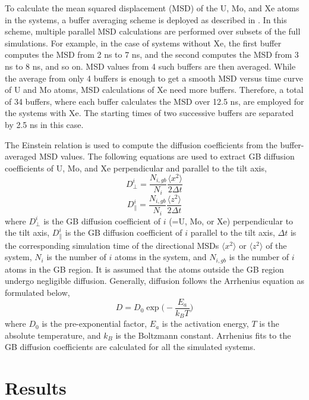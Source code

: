 \documentclass{elsarticle}
\begin{document}
To calculate the mean squared displacement (MSD) of the U, Mo, and Xe atoms in the systems, a buffer averaging scheme is deployed as described in \cite{rapaport2004}. In this scheme, multiple parallel MSD calculations are performed over subsets of the full simulations. For example, in the case of systems without Xe, the first buffer computes the MSD from 2 ns to 7 ns, and the second computes the MSD from 3 ns to 8 ns, and so on. MSD values from 4 such buffers are then averaged. While the average from only 4 buffers is enough to get a smooth MSD versus time curve of U and Mo atoms, MSD calculations of Xe need more buffers. Therefore, a total of 34 buffers, where each buffer calculates the MSD over 12.5 ns, are employed for the systems with Xe. The starting times of two successive buffers are separated by 2.5 ns in this case.

The Einstein relation is used to compute the diffusion coefficients from the buffer-averaged MSD values. The following equations are used to extract GB diffusion coefficients of U, Mo, and Xe perpendicular and parallel to the tilt axis,
\begin{equation}
	D^i_{\perp} = \frac{N_{i, gb}}{N_i} \frac{\langle x^2 \rangle}{2 \Delta t}
\end{equation}
\begin{equation}
	D^i_{\parallel} = \frac{N_{i, gb}}{N_i} \frac{\langle z^2 \rangle}{2 \Delta t}
\end{equation}
where $D^i_{\perp}$ is the GB diffusion coefficient of $i$ (=U, Mo, or Xe) perpendicular to the tilt axis, $D^i_{\parallel}$ is the GB diffusion coefficient of $i$ parallel to the tilt axis, $\Delta t$ is the corresponding simulation time of the directional MSDs $\langle x^2 \rangle$ or $\langle z^2 \rangle$ of the system, $N_i$ is the number of $i$ atoms in the system, and $N_{i, gb}$ is the number of $i$ atoms in the GB region. It is assumed that the atoms outside the GB region undergo negligible diffusion. Generally, diffusion follows the Arrhenius equation as formulated below,
\begin{equation}
	D = D_0 \exp \bigg( -\frac{E_a}{k_B T} \bigg)
\end{equation}
where $D_0$ is the pre-exponential factor, $E_a$ is the activation energy, $T$ is the absolute temperature, and $k_B$ is the Boltzmann constant. Arrhenius fits to the GB diffusion coefficients are calculated for all the simulated systems.


\section{Results}
\end{document}
